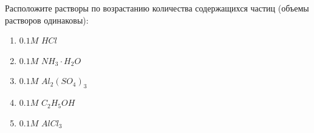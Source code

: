 
Расположите растворы по
возрастанию количества содержащихся частиц (объемы растворов одинаковы):

\begin{enumerate}
    \item $0.1M$ $HCl$
    \item $0.1M$ $NH_3 \cdot H_2O$
    \item $0.1M$ $Al_2(SO_4)_3$
    \item $0.1M$ $C_2H_5OH$
    \item $0.1M$ $AlCl_3$
\end{enumerate}



